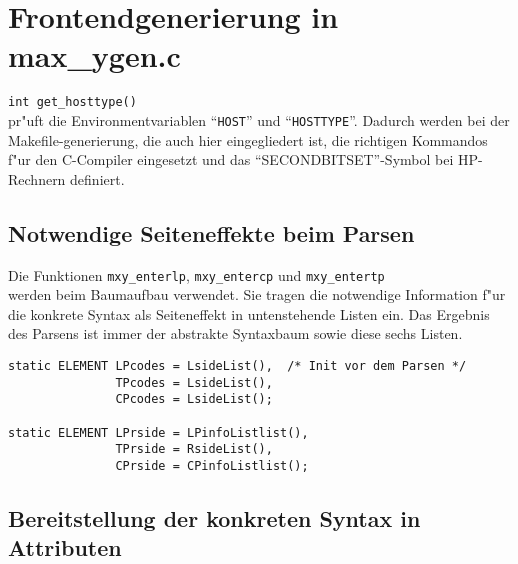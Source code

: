 \newpage
\section{Frontendgenerierung in max\_ygen.c}
\label{frontendgen}

{\tt int get\_hosttype()}\\
pr"uft die Environmentvariablen "`{\tt HOST}"' und "`{\tt HOSTTYPE}"'.
Dadurch werden bei der Makefile-generierung, die auch hier eingegliedert ist,
die richtigen Kommandos f"ur den C-Compiler eingesetzt und das
"`SECONDBITSET"'-Symbol bei HP-Rechnern definiert.

\subsection{Notwendige Seiteneffekte beim Parsen}

Die Funktionen
{\tt mxy\_enterlp}, {\tt mxy\_entercp} und {\tt mxy\_entertp}\\
werden beim Baumaufbau verwendet. Sie tragen die notwendige Information
f"ur die konkrete Syntax als Seiteneffekt in untenstehende Listen ein.
Das Ergebnis des Parsens ist immer der abstrakte Syntaxbaum sowie
diese sechs Listen.

\begin{verbatim}
static ELEMENT LPcodes = LsideList(),  /* Init vor dem Parsen */
               TPcodes = LsideList(),
               CPcodes = LsideList();

static ELEMENT LPrside = LPinfoListlist(),
               TPrside = RsideList(),
               CPrside = CPinfoListlist();
\end{verbatim}

\subsection{Bereitstellung der konkreten Syntax in Attributen}

